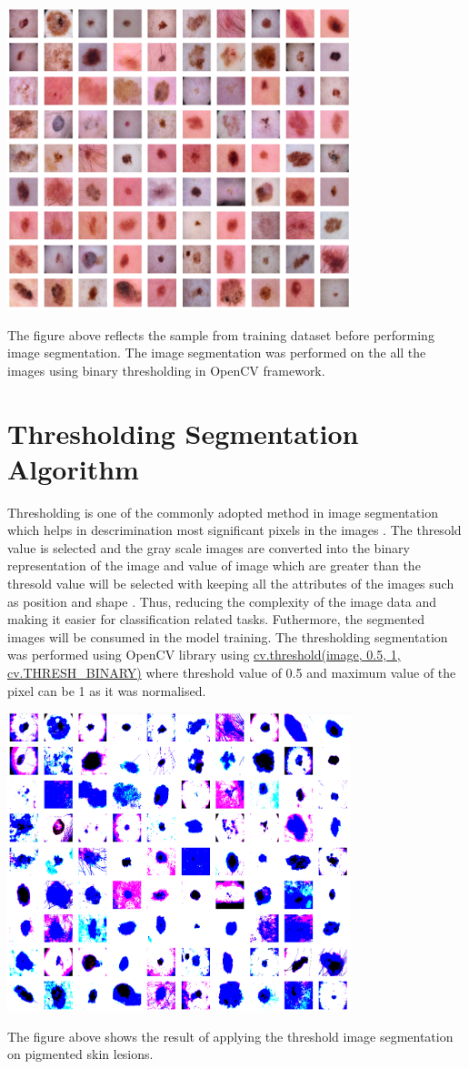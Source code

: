 \begin{center}
	\includegraphics[width=10cm]{Images/bseg.png}
\end{center}

The figure above reflects the sample from training dataset before performing image segmentation.
The image segmentation was performed on the all the images using binary thresholding in OpenCV framework.

\section{Thresholding Segmentation Algorithm}

Thresholding is one of the commonly adopted method in image segmentation which helps in descrimination most 
significant pixels in the images \citep{al2010image}. The thresold value is selected and the gray scale images  
are converted into the binary representation of the image and value of image which are greater than the thresold
value will be selected with keeping all the attributes of the images such as position and shape \citep{al2010image}. 
Thus, reducing the complexity of the image data and making it easier for classification related tasks. Futhermore, the 
segmented images will be consumed in the model training. The thresholding segmentation was performed using OpenCV library using 
\url{cv.threshold(image, 0.5, 1, cv.THRESH_BINARY)} where threshold value of 0.5 and maximum value of the pixel can be 1
as it was normalised.

\begin{center}
	\includegraphics[width=10cm]{Images/aseg.png}
\end{center}

The figure above shows the result of applying the threshold image segmentation on pigmented skin lesions. 
